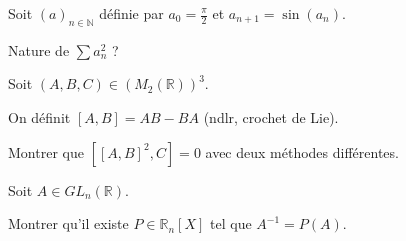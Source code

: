 \noindent Soit $(a)_{n \in \mathbb{N}}$ définie par $a_0 = \frac {\pi} {2}$ et $a_{n+1} = \sin(a_n)$.

\vspace{5pt}
\noindent Nature de $\sum a_n^2$ ?

\subetoiles

\noindent Soit $(A, B, C) \in (M_2(\mathbb{R}))^3$.

\vspace{5pt}
\noindent On définit $\left[A, B\right] = AB - BA$ (ndlr, crochet de Lie).

\vspace{5pt}
\noindent Montrer que $\left[\left[A, B\right]^2, C\right] = 0$ avec deux méthodes différentes.

\subetoiles

\noindent Soit $A \in GL_n(\mathbb{R})$.

\vspace{5pt}
\noindent Montrer qu'il existe $P \in \mathbb{R}_n[X]$ tel que $A^{-1} = P(A)$.
